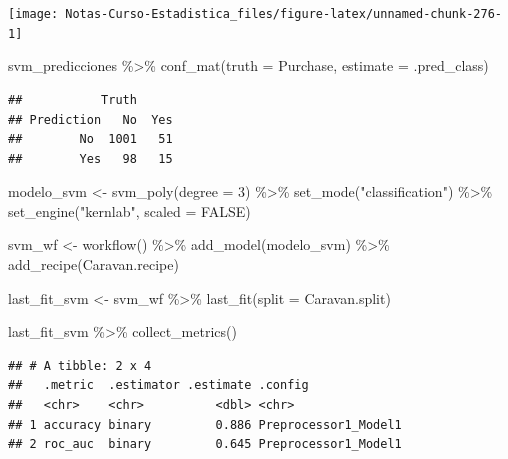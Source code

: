 \documentclass[
  12pt,
]{book}
\newenvironment{Shaded}{\begin{snugshade}}{\end{snugshade}}
\newcommand{\AttributeTok}[1]{\textcolor[rgb]{0.77,0.63,0.00}{#1}}
\newcommand{\ConstantTok}[1]{\textcolor[rgb]{0.00,0.00,0.00}{#1}}
\newcommand{\DecValTok}[1]{\textcolor[rgb]{0.00,0.00,0.81}{#1}}
\newcommand{\FunctionTok}[1]{\textcolor[rgb]{0.00,0.00,0.00}{#1}}
\newcommand{\NormalTok}[1]{#1}
\newcommand{\OtherTok}[1]{\textcolor[rgb]{0.56,0.35,0.01}{#1}}
\newcommand{\SpecialCharTok}[1]{\textcolor[rgb]{0.00,0.00,0.00}{#1}}
\newcommand{\StringTok}[1]{\textcolor[rgb]{0.31,0.60,0.02}{#1}}
\theoremstyle{definition}
\theoremstyle{definition}
\theoremstyle{definition}
\theoremstyle{definition}
\theoremstyle{remark}
\begin{document}
\begin{center}\texttt{[image: Notas-Curso-Estadistica\_files/figure-latex/unnamed-chunk-276-1]} \end{center}

\begin{Shaded}
\begin{Highlighting}[]
\NormalTok{svm\_predicciones }\SpecialCharTok{\%\textgreater{}\%}
    \FunctionTok{conf\_mat}\NormalTok{(}\AttributeTok{truth =}\NormalTok{ Purchase, }\AttributeTok{estimate =}\NormalTok{ .pred\_class)}
\end{Highlighting}
\end{Shaded}

\begin{verbatim}
##           Truth
## Prediction   No  Yes
##        No  1001   51
##        Yes   98   15
\end{verbatim}

\begin{Shaded}
\begin{Highlighting}[]
\NormalTok{modelo\_svm }\OtherTok{\textless{}{-}} \FunctionTok{svm\_poly}\NormalTok{(}\AttributeTok{degree =} \DecValTok{3}\NormalTok{) }\SpecialCharTok{\%\textgreater{}\%}
    \FunctionTok{set\_mode}\NormalTok{(}\StringTok{"classification"}\NormalTok{) }\SpecialCharTok{\%\textgreater{}\%}
    \FunctionTok{set\_engine}\NormalTok{(}\StringTok{"kernlab"}\NormalTok{, }\AttributeTok{scaled =} \ConstantTok{FALSE}\NormalTok{)}

\NormalTok{svm\_wf }\OtherTok{\textless{}{-}} \FunctionTok{workflow}\NormalTok{() }\SpecialCharTok{\%\textgreater{}\%}
    \FunctionTok{add\_model}\NormalTok{(modelo\_svm) }\SpecialCharTok{\%\textgreater{}\%}
    \FunctionTok{add\_recipe}\NormalTok{(Caravan.recipe)}

\NormalTok{last\_fit\_svm }\OtherTok{\textless{}{-}}\NormalTok{ svm\_wf }\SpecialCharTok{\%\textgreater{}\%}
    \FunctionTok{last\_fit}\NormalTok{(}\AttributeTok{split =}\NormalTok{ Caravan.split)}

\NormalTok{last\_fit\_svm }\SpecialCharTok{\%\textgreater{}\%}
    \FunctionTok{collect\_metrics}\NormalTok{()}
\end{Highlighting}
\end{Shaded}

\begin{verbatim}
## # A tibble: 2 x 4
##   .metric  .estimator .estimate .config             
##   <chr>    <chr>          <dbl> <chr>               
## 1 accuracy binary         0.886 Preprocessor1_Model1
## 2 roc_auc  binary         0.645 Preprocessor1_Model1
\end{verbatim}
\end{document}

